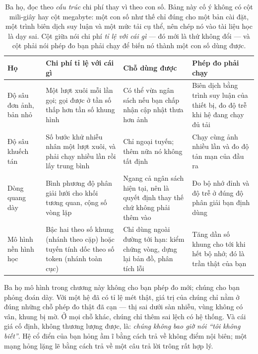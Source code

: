 \documentclass[../../deep_learning.tex]{subfiles}
\begin{document}
\begin{table}[H]\centering\footnotesize
\caption{Ba họ, đọc theo \emph{cấu trúc} chi phí thay vì theo con số. Bảng này cố ý không có cột mili-giây hay cột megabyte: một con số như thế chỉ đúng cho một bản cài đặt, một trình biên dịch suy luận và một mức tải cụ thể, nên chép nó vào tài liệu học là dạy sai. Cột giữa nói chi phí \emph{tỉ lệ với cái gì} --- đó mới là thứ không đổi --- và cột phải nói phép đo bạn phải chạy để biến nó thành một con số dùng được.}
\label{tab:f30-ngan-sach}
\begin{tabularx}{\linewidth}{@{}L{2.7cm}L{3.6cm}YL{3.4cm}@{}}
\toprule
\textbf{Họ} & \textbf{Chi phí tỉ lệ với cái gì} & \textbf{Chỗ dùng được} & \textbf{Phép đo phải chạy}\\
\midrule
Độ sâu đơn ảnh, bản nhỏ & Một lượt xuôi mỗi lần gọi; gọi được ở tần số thấp hơn tần số khung hình & Có thể vừa ngân sách nếu bạn chấp nhận cập nhật thưa hơn ảnh & Biên dịch bằng trình suy luận của thiết bị, đo độ trễ khi hệ đang chạy đủ tải\\
Độ sâu khuếch tán & Số bước khử nhiễu nhân một lượt xuôi, và phải chạy nhiều lần rồi lấy trung bình & Chỉ ngoại tuyến; thêm nữa nó không tất định & Chạy cùng ảnh nhiều lần và đo độ tản mạn của đầu ra\\
Dòng quang dày & Bình phương độ phân giải lưới cho khối tương quan, cộng số vòng lặp & Ngang cả ngân sách  hiện tại, nên là quyết định thay thế chứ không phải thêm vào & Đo bộ nhớ đỉnh và độ trễ ở đúng độ phân giải bạn định dùng\\
Mô hình nền hình học & Bậc hai theo số khung (nhánh theo cặp) hoặc tuyến tính dốc theo số token (nhánh toàn cục) & Chỉ dùng ngoài đường tới hạn: kiểm chứng vòng, dựng lại bản đồ, phân tích lỗi & Tăng dần số khung cho tới khi hết bộ nhớ; đó là trần thật của bạn\\
\bottomrule
\end{tabularx}
\end{table}

\begin{cannho}
Ba họ mô hình trong chương này không cho bạn phép đo mới; chúng cho bạn phỏng đoán dày. Với một hệ đã có tỉ lệ mét thật, giá trị của chúng chỉ nằm ở đúng những chỗ phép đo thật đã cạn --- thị sai dưới sàn nhiễu, vùng không có vân, khung bị mờ. Ở mọi chỗ khác, chúng chỉ thêm sai lệch có hệ thống. Và cái giá cố định, không thương lượng được, là: \emph{chúng không bao giờ nói ``tôi không biết''}. Hệ cổ điển của bạn hỏng ầm ĩ bằng cách trả về không điểm nội biên; một mạng hỏng lặng lẽ bằng cách trả về một câu trả lời trông rất hợp lý.
\end{cannho}
\end{document}
